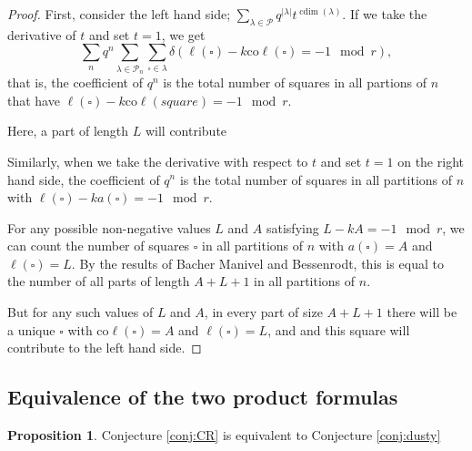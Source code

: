 \documentclass{amsart}[12pt]
\theoremstyle{definition}
\newtheorem{proposition}[dummy]{Proposition}
\newcommand{\PP}{\mathcal{P}} %
\newcommand{\coleg}{\text{co}\ell}
\DeclareMathOperator{\cdim}{cdim}
\begin{document}
\begin{proof}
First, consider the left hand side; $\sum_{\lambda\in\PP} q^{|\lambda|} t^{\cdim(\lambda)}$.  If we take the derivative of $t$ and set $t=1$, we get 
$$\sum_{n} q^n\sum_{\lambda\in\PP_n}\sum_{\square\in\lambda} \delta(\ell(\square)-k\coleg(\square)=-1\mod r),$$
that is, the coefficient of $q^n$ is the total number of squares in all partions of $n$ that have $\ell(\square)-k\coleg(square)=-1\mod r$.  

  Here, a part of length $L$ will contribute 

Similarly, when we take the derivative with respect to $t$ and set $t=1$ on the right hand side, the coefficient of $q^n$ is the total number of squares in all partitions of $n$ with $\ell(\square)-k a(\square)=-1\mod r$. 

For any possible non-negative values $L$ and $A$ satisfying $L-kA=-1\mod r$, we can count the number of squares $\square$ in all partitions of $n$ with $a(\square)=A$ and $\ell(\square)=L$.  By the results of Bacher Manivel and Bessenrodt, this is equal to the number of all parts of length $A+L+1$ in all partitions of $n$.  

But for any such values of $L$ and $A$, in every part of size $A+L+1$ there will be a unique $\square$ with $\coleg(\square)=A$ and $\ell(\square)=L$, and and this square will contribute to the left hand side.


\end{proof}



\subsection{Equivalence of the two product formulas}
\label{sec:prod-equiv}

\begin{proposition}
Conjecture \ref{conj:CR} is equivalent to Conjecture \ref{conj:dusty}
\end{proposition}
\end{document}
